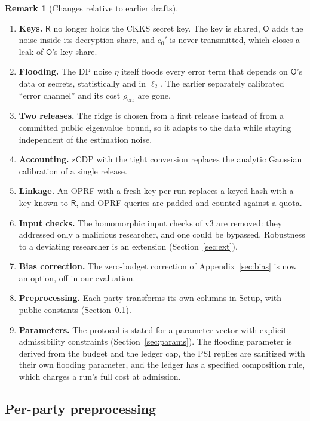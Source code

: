 \documentclass[11pt]{article}
\theoremstyle{definition}
\newtheorem{remark}{Remark}[section]
\theoremstyle{plain}
\newcommand{\Party}[1]{\textsf{#1}}
\newcommand{\Rp}{\Party{R}}
\newcommand{\Op}{\Party{O}}
\begin{document}
\begin{remark}[Changes relative to earlier drafts]
\label{rem:changes}
\begin{enumerate}[noitemsep, label=(\roman*)]
  \item \textbf{Keys.} $\Rp$ no longer holds the CKKS secret key. The key is shared, $\Op$ adds the noise inside its decryption share, and $c_0'$ is never transmitted, which closes a leak of $\Op$'s key share.
  \item \textbf{Flooding.} The DP noise $\eta$ itself floods every error term that depends on $\Op$'s data or secrets, statistically and in $\ell_2$. The earlier separately calibrated ``error channel'' and its cost $\rho_{\mathrm{err}}$ are gone.
  \item \textbf{Two releases.} The ridge is chosen from a first release instead of from a committed public eigenvalue bound, so it adapts to the data while staying independent of the estimation noise.
  \item \textbf{Accounting.} zCDP with the tight conversion replaces the analytic Gaussian calibration of a single release.
  \item \textbf{Linkage.} An OPRF with a fresh key per run replaces a keyed hash with a key known to $\Rp$, and OPRF queries are padded and counted against a quota.
  \item \textbf{Input checks.} The homomorphic input checks of v3 are removed: they addressed only a malicious researcher, and one could be bypassed. Robustness to a deviating researcher is an extension (Section~\ref{sec:ext}).
  \item \textbf{Bias correction.} The zero-budget correction of Appendix~\ref{sec:bias} is now an option, off in our evaluation.
  \item \textbf{Preprocessing.} Each party transforms its own columns in Setup, with public constants (Section~\ref{sec:protocol:preproc}).
  \item \textbf{Parameters.} The protocol is stated for a parameter vector with explicit admissibility constraints (Section~\ref{sec:params}). The flooding parameter is derived from the budget and the ledger cap, the PSI replies are sanitized with their own flooding parameter, and the ledger has a specified composition rule, which charges a run's full cost at admission.
\end{enumerate}
\end{remark}

\subsection{Per-party preprocessing}
\label{sec:protocol:preproc}
\end{document}
